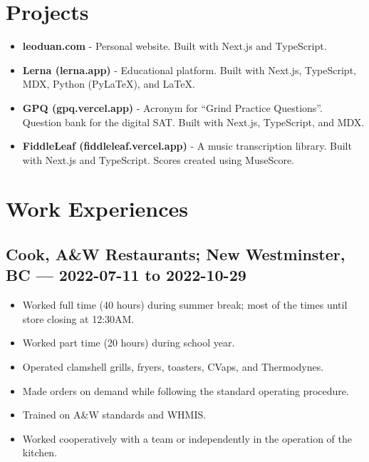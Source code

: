 \documentclass{article}
\begin{document}
\section*{Projects}

\begin{itemize}
	\item \textbf{leoduan.com} - Personal website. Built with Next.js and TypeScript.
	\item \textbf{Lerna (lerna.app)} - Educational platform. Built with Next.js, TypeScript, MDX, Python (PyLaTeX), and LaTeX.
	\item \textbf{GPQ (gpq.vercel.app)} - Acronym for ``Grind Practice Questions''. Question bank for the digital SAT. Built with Next.js, TypeScript, and MDX.
	\item \textbf{FiddleLeaf (fiddleleaf.vercel.app)} - A music transcription library. Built with Next.js and TypeScript. Scores created using MuseScore.
\end{itemize}

\section*{Work Experiences}

\subsection*{Cook, A\&W Restaurants; New Westminster, BC — 2022-07-11 to 2022-10-29}

\begin{itemize}
	\item Worked full time (40 hours) during summer break; most of the times until store closing at 12:30AM.
	\item Worked part time (20 hours) during school year.
	\item Operated clamshell grills, fryers, toasters, CVaps, and Thermodynes.
	\item Made orders on demand while following the standard operating procedure.
	\item Trained on A\&W standards and WHMIS.
	\item Worked cooperatively with a team or independently in the operation of the kitchen.
\end{itemize}

\end{document}
